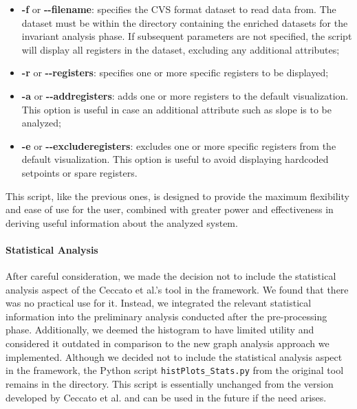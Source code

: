 \begin{itemize}
	\item \textbf{-f} or \textbf{{-}{-}filename}: specifies the CVS format dataset to read data from. The dataset must be within the directory containing the enriched datasets for the invariant analysis phase. If subsequent parameters are not specified, the script will display all registers in the dataset, excluding any additional attributes;
	
	\item \textbf{-r} or \textbf{{-}{-}registers}: specifies one or more specific registers to be displayed;
	
	\item \textbf{-a} or \textbf{{-}{-}addregisters}: adds one or more registers to the default visualization. This option is useful in case an additional attribute such as slope is to be analyzed;
	
	\item \textbf{-e} or \textbf{{-}{-}excluderegisters}: excludes one or more specific registers from the default visualization. This option is useful to avoid displaying hardcoded setpoints or spare registers.
\end{itemize}
This script, like the previous ones, is designed to provide the maximum flexibility and ease of use for the user, combined with greater power and effectiveness in deriving useful information about the analyzed system.

\paragraph{Statistical Analysis} After careful consideration, we made the decision not to include the statistical analysis aspect of the Ceccato et al.'s tool in the framework. We found that there was no practical use for it. Instead, we integrated the relevant statistical information into the preliminary analysis conducted after the pre-processing phase. Additionally, we deemed the histogram to have limited utility and considered it outdated in comparison to the new graph analysis approach we implemented. \newline
Although we decided not to include the statistical analysis aspect in the framework, the Python script \texttt{histPlots\_Stats.py} from the original tool remains in the directory. This script is essentially unchanged from the version developed by Ceccato et al. and can be used in the future if the need arises. 

